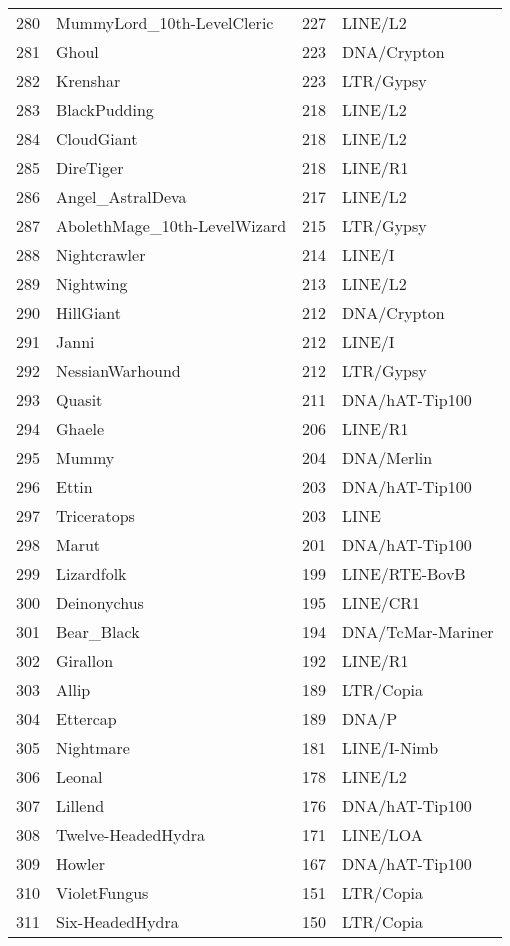 \begin{table}[ht]
\begin{tabular}{rlrl}
  280 & MummyLord\_10th-LevelCleric & 227 & LINE/L2  \\ 
  281 & Ghoul & 223 & DNA/Crypton  \\ 
  282 & Krenshar & 223 & LTR/Gypsy  \\ 
  283 & BlackPudding & 218 & LINE/L2  \\ 
  284 & CloudGiant & 218 & LINE/L2  \\ 
  285 & DireTiger & 218 & LINE/R1  \\ 
  286 & Angel\_AstralDeva & 217 & LINE/L2  \\ 
  287 & AbolethMage\_10th-LevelWizard & 215 & LTR/Gypsy  \\ 
  288 & Nightcrawler & 214 & LINE/I  \\ 
  289 & Nightwing & 213 & LINE/L2  \\ 
  290 & HillGiant & 212 & DNA/Crypton  \\ 
  291 & Janni & 212 & LINE/I  \\ 
  292 & NessianWarhound & 212 & LTR/Gypsy  \\ 
  293 & Quasit & 211 & DNA/hAT-Tip100  \\ 
  294 & Ghaele & 206 & LINE/R1  \\ 
  295 & Mummy & 204 & DNA/Merlin  \\ 
  296 & Ettin & 203 & DNA/hAT-Tip100  \\ 
  297 & Triceratops & 203 & LINE  \\ 
  298 & Marut & 201 & DNA/hAT-Tip100  \\ 
  299 & Lizardfolk & 199 & LINE/RTE-BovB  \\ 
  300 & Deinonychus & 195 & LINE/CR1  \\ 
  301 & Bear\_Black & 194 & DNA/TcMar-Mariner  \\ 
  302 & Girallon & 192 & LINE/R1  \\ 
  303 & Allip & 189 & LTR/Copia  \\ 
  304 & Ettercap & 189 & DNA/P  \\ 
  305 & Nightmare & 181 & LINE/I-Nimb  \\ 
  306 & Leonal & 178 & LINE/L2  \\ 
  307 & Lillend & 176 & DNA/hAT-Tip100  \\ 
  308 & Twelve-HeadedHydra & 171 & LINE/LOA  \\ 
  309 & Howler & 167 & DNA/hAT-Tip100  \\ 
  310 & VioletFungus & 151 & LTR/Copia  \\ 
  311 & Six-HeadedHydra & 150 & LTR/Copia  \\ 

\end{tabular}
\end{table}
